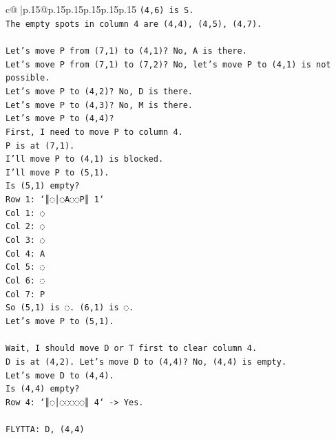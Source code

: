 \documentclass{article}
\begin{document}
{\begin{supertabular}{c@{$\;$}|p{.15\linewidth}@{}p{.15\linewidth}p{.15\linewidth}p{.15\linewidth}p{.15\linewidth}p{.15\linewidth}}
{{{\texttt{(4,6) is S.} \\
\texttt{The empty spots in column 4 are (4,4), (4,5), (4,7).} \\
\\ 
\texttt{Let's move P from (7,1) to (4,1)? No, A is there.} \\
\texttt{Let's move P from (7,1) to (7,2)? No, let's move P to (4,1) is not possible.} \\
\texttt{Let's move P to (4,2)? No, D is there.} \\
\texttt{Let's move P to (4,3)? No, M is there.} \\
\texttt{Let's move P to (4,4)?} \\
\texttt{First, I need to move P to column 4.} \\
\texttt{P is at (7,1).} \\
\texttt{I'll move P to (4,1) is blocked.} \\
\texttt{I'll move P to (5,1).} \\
\texttt{Is (5,1) empty?} \\
\texttt{Row 1: `║◌│◌A◌◌P║ 1`} \\
\texttt{Col 1: ◌} \\
\texttt{Col 2: ◌} \\
\texttt{Col 3: ◌} \\
\texttt{Col 4: A} \\
\texttt{Col 5: ◌} \\
\texttt{Col 6: ◌} \\
\texttt{Col 7: P} \\
\texttt{So (5,1) is ◌. (6,1) is ◌.} \\
\texttt{Let's move P to (5,1).} \\
\\ 
\texttt{Wait, I should move D or T first to clear column 4.} \\
\texttt{D is at (4,2). Let's move D to (4,4)? No, (4,4) is empty.} \\
\texttt{Let's move D to (4,4).} \\
\texttt{Is (4,4) empty?} \\
\texttt{Row 4: `║◌│◌◌◌◌◌║ 4` {-}> Yes.} \\
\\ 
\texttt{FLYTTA: D, (4,4)} \\
            }
        }
    }
     \\ \\


\end{supertabular}}
\end{document}
